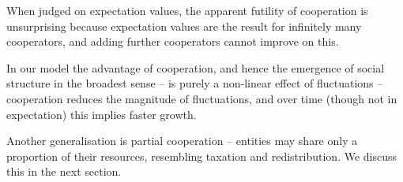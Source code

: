 When judged on expectation values, the apparent futility of cooperation is unsurprising
because expectation values are the result for infinitely 
many cooperators, and adding further cooperators cannot improve on this.

In our model the advantage of cooperation, and hence the emergence
of social structure in the broadest sense -- is purely a non-linear 
effect of fluctuations -- cooperation reduces the magnitude of 
fluctuations, and over time (though not in expectation) this implies faster growth. 


Another generalisation is partial cooperation -- entities may share only
a proportion of their resources, resembling taxation and redistribution. We discuss this in the next section.


